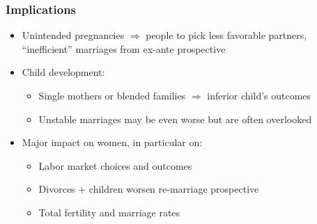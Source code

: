 \documentclass{beamer}
\begin{document}
\begin{frame}
\frametitle{Implications}
\begin{itemize}
\item Unintended pregnancies $\Rightarrow$ people to pick less favorable partners, ``inefficient'' marriages from ex-ante prospective
\item Child development:
\begin{itemize}
\item Single mothers or blended families $\Rightarrow$ inferior child's outcomes
\item Unstable marriages may be even worse but are often overlooked
\end{itemize}
\item Major impact on women, in particular on:
\begin{itemize}
\item Labor market choices and outcomes
\item Divorces + children worsen re-marriage prospective
\item Total fertility and marriage rates
\end{itemize}
\end{itemize}
\end{frame}
\end{document}
